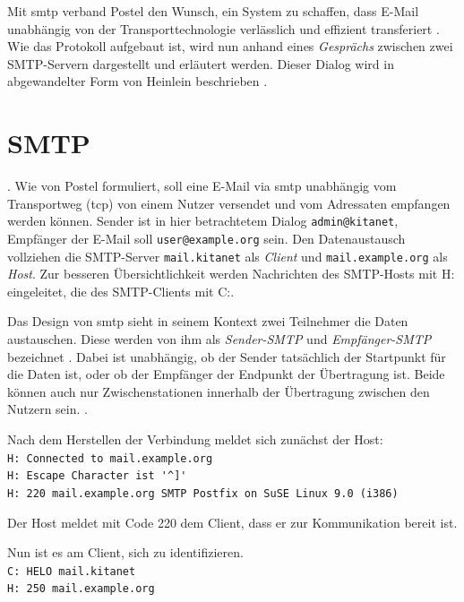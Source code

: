 Mit \ac{smtp} verband Postel den Wunsch, ein System zu schaffen, dass E-Mail unabhängig von der Transporttechnologie verlässlich und effizient transferiert \citep[vgl.][1]{rfc821}. Wie das Protokoll aufgebaut ist, wird nun anhand eines \textit{Gesprächs} zwischen zwei SMTP-Servern dargestellt und erläutert werden. Dieser Dialog wird in abgewandelter Form von Heinlein beschrieben \citep[vgl.][S. 24 ff.]{Heinlein2004}. 

\section{SMTP}

 \citep[][11]{rfc821}.
Wie von Postel formuliert, soll eine E-Mail via \ac{smtp} unabhängig vom Transportweg (\zb \ac{tcp}) von einem Nutzer versendet und vom Adressaten empfangen werden können. Sender ist in hier betrachtetem Dialog \verb+admin@kitanet+, Empfänger der E-Mail soll \verb+user@example.org+ sein. Den Datenaustausch vollziehen die SMTP-Server \verb+mail.kitanet+ als \textit{Client} und \verb+mail.example.org+ als \textit{Host}. Zur besseren Übersichtlichkeit werden Nachrichten des SMTP-Hosts mit H: eingeleitet, die des SMTP-Clients mit C:.

Das Design von \ac{smtp} sieht in seinem Kontext zwei Teilnehmer die Daten austauschen. Diese werden von ihm als \textit{Sender-SMTP} und \textit{Empfänger-SMTP} bezeichnet \citep[vgl.][2]{rfc821}. Dabei ist unabhängig, ob der Sender tatsächlich der Startpunkt für die Daten ist, oder ob der Empfänger der Endpunkt der Übertragung ist. Beide können auch nur Zwischenstationen innerhalb der Übertragung zwischen den Nutzern sein.  \citep[][2]{rfc821}.

Nach dem Herstellen der Verbindung meldet sich zunächst der Host:\\
\verb+H: Connected to mail.example.org+ \\ 
\verb+H: Escape Character ist '^]'+ \\
\verb+H: 220 mail.example.org SMTP Postfix on SuSE Linux 9.0 (i386)+

Der Host meldet mit Code 220  \citep[][38]{rfc821} dem Client, dass er zur Kommunikation bereit ist. 

Nun ist es am Client, sich zu identifizieren. \\
\verb+C: HELO mail.kitanet+ \\ 
\verb+H: 250 mail.example.org+


